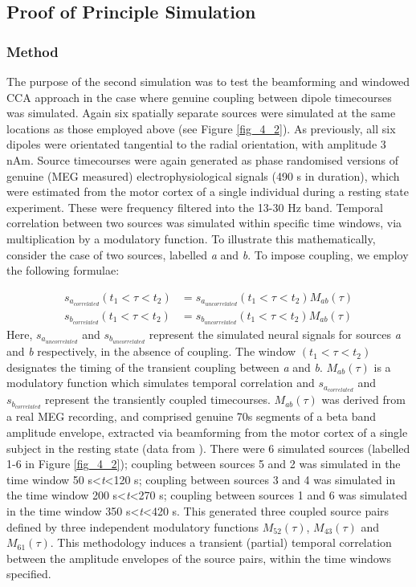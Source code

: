\subsection{Proof of Principle Simulation}
\subsubsection{Method}
The purpose of the second simulation was to test the beamforming and windowed CCA approach in the case where genuine coupling between dipole timecourses was simulated. Again six spatially separate sources were simulated at the same locations as those employed above (see Figure \ref{fig_4_2}). As previously, all six dipoles were orientated tangential to the radial orientation, with amplitude 3 nAm. Source timecourses were again generated as phase randomised versions of genuine (MEG measured) electrophysiological signals (490 s in duration), which were estimated from the motor cortex of a single individual during a resting state experiment. These were frequency filtered into the 13-30 Hz band. Temporal correlation between two sources was simulated within specific time windows, via multiplication by a modulatory function. To illustrate this mathematically, consider the case of two sources, labelled \textit{a} and \textit{b}. To impose coupling, we employ the following formulae:

\begin{align}
s_{a_{correlated}}(t_1 < \tau <t_2) &= s_{a_{uncorrelated}}(t_1 < \tau <t_2)M_{ab}(\tau) \label{eqn_4_25}\\
s_{b_{correlated}}(t_1 < \tau <t_2) &= s_{b_{uncorrelated}}(t_1 < \tau <t_2)M_{ab}(\tau) \label{eqn_4_26}
\end{align} Here, $s_{a_{uncorrelated}}$ and $s_{b_{uncorrelated}}$ represent the simulated neural signals for sources \textit{a} and \textit{b} respectively, in the absence of coupling. The window $(t_1 < \tau <t_2)$ designates the timing of the transient coupling between \textit{a} and \textit{b}. $M_{ab}(\tau)$ is a modulatory function which simulates temporal correlation and $s_{a_{correlated}}$ and $s_{b_{correlated}}$ represent the transiently coupled timecourses. $M_{ab}(\tau)$ was derived from a real MEG recording, and comprised genuine 70s segments of a beta band amplitude envelope, extracted via beamforming from the motor cortex of a single subject in the resting state  (data from \cite{Brookes2011a}). There were 6 simulated sources (labelled 1-6 in Figure \ref{fig_4_2}); coupling between sources 5 and 2 was simulated in the time window 50 s<\textit{t}<120 s; coupling between sources 3 and 4 was simulated in the time window 200 s<\textit{t}<270 s; coupling between sources 1 and 6 was simulated in the time window 350 s<\textit{t}<420 s. This generated three coupled source pairs defined by three independent modulatory functions $M_{52}(\tau)$,  $M_{43}(\tau)$ and $M_{61}(\tau)$. This methodology induces a transient (partial) temporal correlation between the amplitude envelopes of the source pairs, within the time windows specified. 

